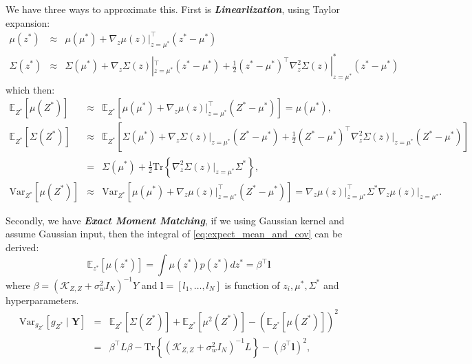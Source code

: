 \documentclass[10pt]{elegantbook}
\newcommand{\mydefination}[1]{\textbf{\textit{\textcolor{structurecolor}{#1}}}}
\begin{document}
We have three ways to approximate this. First is \mydefination{Linearlization}, using Taylor expansion:
\begin{equation}
    \begin{array}{lll}
        \mu(z^{\ast}) & \approx & \mu(\mu^{\ast})+\nabla_{z}\mu(z)|_{z=\mu^{\ast}}^{\top}(z^{\ast}-\mu^{\ast})
        \\ \Sigma(z^{\ast}) & \approx & \Sigma(\mu^{\ast})+\nabla_{z}\Sigma(z)|_{z=\mu^{\ast}}^{\top}(z^{\ast}-\mu^{\ast}) + 
        \frac{1}{2}(z^{\ast}-\mu^{\ast})^{\top}\nabla_{z}^{2}\Sigma(z)|_{z=\mu^{\ast}}^{\ast}(z^{\ast}-\mu^{\ast})
    \end{array}
\end{equation}
which then:
\begin{equation}
\begin{array}{lll}
\mathbb{E}_{Z^*}[\mu(Z^*)] &\approx& \mathbb{E}_{Z^*}[\mu(\mu^*) + \nabla_z \mu(z)\big|_{z = \mu^*}^{\!\!\!\!\!\!\top} (Z^* - \mu^*)] 
= \mu(\mu^*), \\
\mathbb{E}_{Z^*}[\Sigma(Z^*)] &\approx& \mathbb{E}_{Z^*}[\Sigma(\mu^*) + \nabla_z \Sigma(z)\big|_{z = \mu^*} (Z^* - \mu^*) + \frac{1}{2} (Z^* - \mu^*)^\top \nabla_z^2 \Sigma(z)\big|_{z = \mu^*} (Z^* - \mu^*)] \\
&=& \Sigma(\mu^*) + \frac{1}{2} \mathrm{Tr}\left\{\nabla_z^2 \Sigma(z)\big|_{z = \mu^*} \Sigma^*\right\}, \\
\mathrm{Var}_{Z^*}[\mu(Z^*)] &\approx& \mathrm{Var}_{Z^*}[\mu(\mu^*) + \nabla_z \mu(z)\big|_{z = \mu^*}^{\!\!\!\!\!\!\top} (Z^* - \mu^*)] 
= \nabla_z \mu(z)\big|_{z = \mu^*}^{\!\!\!\!\!\!\top} \Sigma^* \nabla_z \mu(z)\big|_{z = \mu^*}.
\end{array}
\end{equation}

Secondly, we have \mydefination{Exact Moment Matching}, if we using Gaussian kernel and assume Gaussian input, then the 
integral of \ref{eq:expect_mean_and_cov} can be derived:
\[
\mathbb{E}_{z^{*}}[\mu(z^{*})]=\int\mu(z^{*})p(z^{*})d z^{*} = \beta^{\top} \mathbf l
\]
where $\beta = (\mathscr{K}_{Z, Z} + \sigma_w^2 I_N)^{-1} Y$ and $\mathbf l = [l_1, \ldots, l_N]$ is function of $z_i, \mu^*
, \Sigma^*$ and hyperparameters.
\[
\begin{array}{lll}
    \text{Var}_{g_{Z^*}}[g_{Z^*} \mid \mathbf{Y}] 
    &=& \mathbb{E}_{Z^*}[\Sigma(Z^*)] + \mathbb{E}_{Z^*}[\mu^2(Z^*)] - \left( \mathbb{E}_{Z^*}[\mu(Z^*)] \right)^2 \\
    &=& \beta^\top L \beta - \mathrm{Tr} \left\{ \left( \mathscr{K}_{Z,Z} + \sigma_w^2 I_N \right)^{-1} L \right\} - \left( \beta^\top \mathbf{l} \right)^2,
\end{array}
\]
\end{document}
